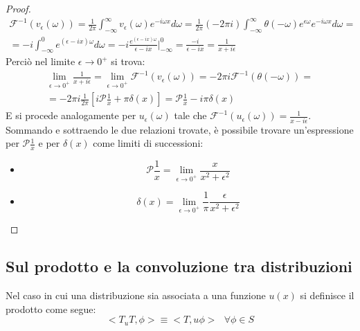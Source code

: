 \documentclass[twoside]{article}
\begin{document}
\begin{proof}
\begin{equation}\begin{split}
\mathcal{F}^{-1}(v_{\epsilon}(\omega))=\frac{1}{2\pi}\int_{-\infty}^{\infty}v_{\epsilon}(\omega)e^{-i\omega x}d\omega=\frac{1}{2\pi}(-2\pi i)\int_{-\infty}^{\infty}\theta(-\omega)e^{\epsilon \omega}e^{-i\omega x}d\omega= \\
=-i \int_{-\infty}^0 e^{(\epsilon-ix)\omega}d\omega=-i \frac{e^{(\epsilon-ix)\omega}}{\epsilon-ix}\left. \right|_{-\infty}^0 = \frac{-i}{\epsilon-ix}=\frac{1}{x+i\epsilon}
\end{split}\end{equation}
Perciò nel limite $\epsilon \to 0^+$ si trova:
\begin{equation}
    \begin{split}
        \lim_{\epsilon\to 0^+}\frac{1}{x+i\epsilon}=\lim_{\epsilon\to 0^+}\mathcal{F}^{-1}(v_{\epsilon}(\omega))=-2\pi i \mathcal{F}^{-1}(\theta (-\omega))= \\
        = -2\pi i \frac{1}{2\pi}\left[i\mathcal{P}\frac{1}{x}+\pi \delta(x) \right]=\mathcal{P}\frac{1}{x}-i\pi \delta(x)
        \end{split}
\end{equation}
E si procede analogamente per $u_{\epsilon}(\omega)$ tale che $\mathcal{F}^{-1}(u_{\epsilon}(\omega))=\frac{1}{x-i\epsilon}$.
\\
Sommando e sottraendo le due relazioni trovate, è possibile trovare un'espressione per $\mathcal{P}\frac{1}{x}$ e per $\delta(x)$ come limiti di successioni:
\begin{itemize}
    \item 
    \begin{equation}
    \mathcal{P}\frac{1}{x}=\lim_{\epsilon\to 0^+}\frac{x}{x^2+\epsilon^2}
    \end{equation}
    \item
    \begin{equation}\label{delta}
        \delta(x)=\lim_{\epsilon\to 0^+}\frac{1}{\pi}\frac{\epsilon}{x^2+\epsilon^2}
    \end{equation}
\end{itemize}

\end{proof}

\subsection{Sul prodotto e la convoluzione tra distribuzioni}
Nel caso in cui una distribuzione sia associata a una funzione $u(x)$ si definisce il prodotto come segue:
\begin{equation}
    <T_uT,\phi>\equiv <T,u\phi> \ \ \ \forall \phi \in S
\end{equation}
\end{document}
